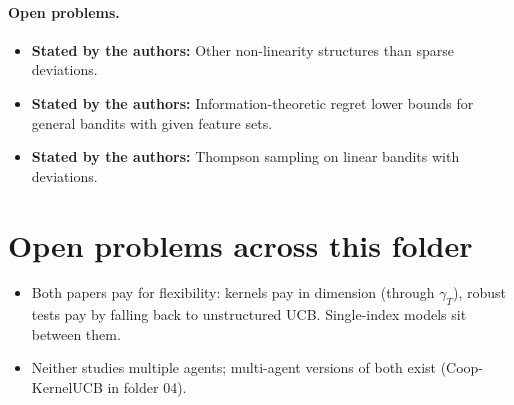 \documentclass[11pt]{article}
\newcommand{\stated}{\textcolor{green!40!black}{\textbf{Stated by the authors:}}}
\begin{document}
\paragraph{Open problems.}
\begin{itemize}\item \stated{} Other non-linearity structures than sparse deviations.\item \stated{} Information-theoretic regret lower bounds for general bandits with given feature sets.\item \stated{} Thompson sampling on linear bandits with deviations.\end{itemize}
\section{Open problems across this folder}
\begin{itemize}\item Both papers pay for flexibility: kernels pay in dimension (through $\gamma_T$), robust tests pay by falling back to unstructured UCB. Single-index models sit between them.\item Neither studies multiple agents; multi-agent versions of both exist (Coop-KernelUCB in folder 04).\end{itemize}
\end{document}
